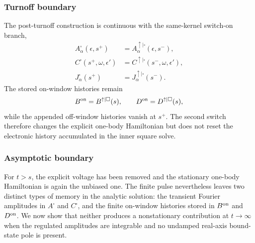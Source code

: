 \documentclass[
 reprint,
 superscriptaddress,
 amsmath,amssymb,
 aps,prb,
 longbibliography,
 floatfix
]{revtex4-2}
\begin{document}
\subsubsection{Turnoff boundary}

The post-turnoff construction is continuous with the same-kernel switch-on branch,
\begin{equation*}
\begin{aligned}
A_\alpha^\square(\epsilon,s^+)
&=
A_\alpha^{\uparrow|\square}(\epsilon,s^-),
\\
C^\square(s^+,\omega,\epsilon')
&=
C^{\uparrow|\square}(s^-,\omega,\epsilon'),
\\
J_\alpha^\square(s^+)
&=
J_\alpha^{\uparrow|\square}(s^-).
\end{aligned}
\end{equation*}
The stored on-window histories remain
\begin{equation*}
B^{\rm on}=B^{\uparrow|\square}(s),
\qquad
D^{\rm on}=D^{\uparrow|\square}(s),
\end{equation*}
while the appended off-window histories vanish at \(s^+\). The second switch therefore changes the explicit one-body Hamiltonian but does not reset the electronic history accumulated in the inner square solve.

\subsubsection{Asymptotic boundary}

For \(t>s\), the explicit voltage has been removed and the stationary one-body Hamiltonian is again the unbiased one. The finite pulse nevertheless leaves two distinct types of memory in the analytic solution: the transient Fourier amplitudes in \(A^\square\) and \(C^\square\), and the finite on-window histories stored in \(B^{\rm on}\) and \(D^{\rm on}\). We now show that neither produces a nonstationary contribution at \(t\to\infty\) when the regulated amplitudes are integrable and no undamped real-axis bound-state pole is present.
\end{document}
